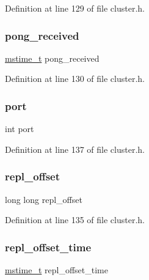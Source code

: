 Definition at line 129 of file cluster.\+h.

\mbox{\label{structcluster_node_a75edda4c1e1a12f413686e691938cb56}} 
\subsubsection{\texorpdfstring{pong\+\_\+received}{pong\_received}}
{\footnotesize\ttfamily \hyperlink{redismodule_8h_a652ae61e2475bc8957454534544968fc}{mstime\+\_\+t} pong\+\_\+received}



Definition at line 130 of file cluster.\+h.

\mbox{\label{structcluster_node_a63c89c04d1feae07ca35558055155ffb}} 
\subsubsection{\texorpdfstring{port}{port}}
{\footnotesize\ttfamily int port}



Definition at line 137 of file cluster.\+h.

\mbox{\label{structcluster_node_acaaa973071b682ff89c70991a2d3ce7a}} 
\subsubsection{\texorpdfstring{repl\+\_\+offset}{repl\_offset}}
{\footnotesize\ttfamily long long repl\+\_\+offset}



Definition at line 135 of file cluster.\+h.

\mbox{\label{structcluster_node_ac38b49df545f207bd84bb341d90446ed}} 
\subsubsection{\texorpdfstring{repl\+\_\+offset\+\_\+time}{repl\_offset\_time}}
{\footnotesize\ttfamily \hyperlink{redismodule_8h_a652ae61e2475bc8957454534544968fc}{mstime\+\_\+t} repl\+\_\+offset\+\_\+time}



